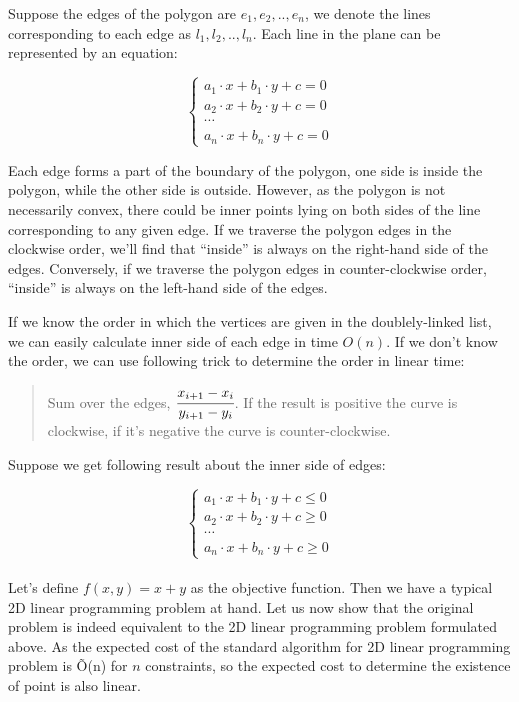 
Suppose the edges of the polygon are $e_1, e_2, .., e_n$, we denote the lines corresponding to each edge as $l_1, l_2, .., l_n$. Each line in the plane can be represented by an equation:

\[
  \left\{
      \begin{array}{c}
          a_1 \cdot x + b_1 \cdot y + c = 0 \\
          a_2 \cdot x + b_2 \cdot y + c = 0 \\
          \cdots \\
          a_n \cdot x + b_n \cdot y + c = 0
      \end{array}
  \right.
\]

Each edge forms a part of the boundary of the polygon, one side is inside the polygon, while the other side is outside. However, as the polygon is not necessarily convex, there could be inner points lying on both sides of the line corresponding to any given edge. If we traverse the polygon edges in the clockwise order, we'll find that ``inside'' is always on the right-hand side of the edges. Conversely, if we traverse the polygon edges in counter-clockwise order, ``inside'' is always on the left-hand side of the edges.

If we know the order in which the vertices are given in the doublely-linked list, we can easily calculate inner side of each edge in time $O(n)$. If we don't know the order, we can use following trick to determine the order in linear time:

\begin{quote}
  Sum over the edges, $\cfrac{x_{i+1}-x_i}{y_{i+1}-y_i}$. If the result is positive the curve is clockwise, if it's negative the curve is counter-clockwise.
\end{quote}

Suppose we get following result about the inner side of edges:

\[
  \left\{
      \begin{array}{c}
          a_1 \cdot x + b_1 \cdot y + c \leq 0 \\
          a_2 \cdot x + b_2 \cdot y + c \geq 0 \\
          \cdots \\
          a_n \cdot x + b_n \cdot y + c \geq 0
      \end{array}
  \right.
\]\\

Let's define $f(x, y) = x + y$ as the objective function. Then we have a typical 2D linear programming problem at hand. Let us now show that the original problem is indeed equivalent to the 2D linear programming problem formulated above. As the expected cost of the standard algorithm for 2D linear programming problem is \~O(n) for $n$ constraints, so the expected cost to determine the existence of point is also linear.\\

